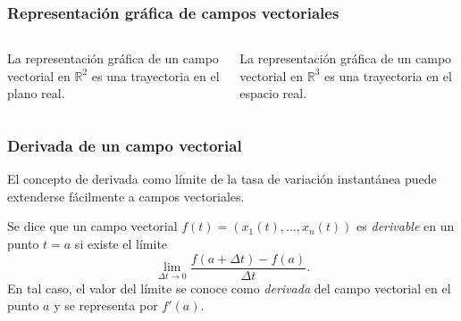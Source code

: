 \begin{frame}
	\frametitle{Representación gráfica de campos vectoriales}
	
	\begin{columns}
		\begin{column}{0.5\textwidth}
			La representación gráfica de un campo vectorial en $\mathbb{R}^2$ es una trayectoria en el plano real.
			\begin{center}
			\end{center}
		\end{column}
		\begin{column}{0.5\textwidth}
			La representación gráfica de un campo vectorial en $\mathbb{R}^3$ es una trayectoria en el espacio real.
			\begin{center}
			\end{center}
		\end{column}
	\end{columns}
\end{frame}



\begin{frame}
	\frametitle{Derivada de un campo vectorial}
	El concepto de derivada como límite de la tasa de variación instantánea puede extenderse fácilmente a campos vectoriales. 
	
	\begin{definicion}
		Se dice que un campo vectorial $f(t)=(x_1(t),\ldots,x_n(t))$ es \emph{derivable} en un punto $t=a$ si existe el límite
		\[
			\lim_{\Delta t\rightarrow 0} \frac{f(a+\Delta t)-f(a)}{\Delta t}.
		\]
		En tal caso, el valor del límite se conoce como \emph{derivada} del campo vectorial en el punto $a$ y se representa por $f'(a)$.
	\end{definicion}
\end{frame}



